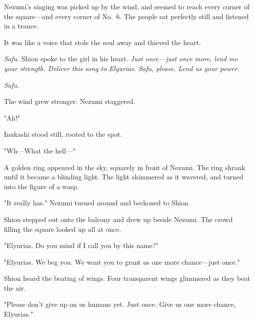 Nezumi's singing was picked up by the wind, and seemed to reach every
corner of the square---and every corner of No.~6. The people sat perfectly
still and listened in a trance.

It was like a voice that stole the soul away and thieved the heart.

\emph{Safu.} Shion spoke to the girl in his heart. \emph{Just once---just once more,
lend me your strength. Deliver this song to Elyurias. Safu, please. Lend
us your power.}


\emph{Safu.}

The wind grew stronger. Nezumi staggered.

"Ah!"

Inukashi stood still, rooted to the spot.

"Wh---What the hell---"

A golden ring appeared in the sky, squarely in front of Nezumi. The ring
shrank until it became a blinding light. The light shimmered as it
wavered, and turned into the figure of a wasp.


"It really has." Nezumi turned around and beckoned to Shion.


Shion stepped out onto the balcony and drew up beside Nezumi. The crowd
filling the square looked up all at once.

"Elyurias. Do you mind if I call you by this name?"


"Elyurias. We beg you. We want you to grant us one more chance---just
once."

Shion heard the beating of wings. Four transparent wings glimmered as
they beat the air.

"Please don't give up on us humans yet. Just once. Give us one more
chance, Elyurias."



